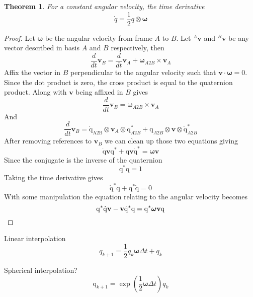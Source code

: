 \documentclass{amsart}
\newtheorem{theorem}{Theorem}[section]
\theoremstyle{definition}
\theoremstyle{remark}
\numberwithin{equation}{section}
\begin{document}
\begin{theorem}
  For a constant angular velocity, the time derivative 
  \begin{equation}
    \dot{q} = \frac{1}{2} q \otimes \boldsymbol\omega
  \end{equation}
\end{theorem}
\begin{proof}
  Let $\boldsymbol\omega$ be the angular velocity from frame $A$ to $B$. Let $^A\mathbf{v}$ and $^B\mathbf{v}$ be any vector described in basis $A$ and $B$ respectively, then
  \begin{equation}
    \frac{d}{dt} {\mathbf{v}_B} = \frac{d}{dt} {\mathbf{v}_A} + \boldsymbol\omega_{A2B} \times {\mathbf{v}_A}
  \end{equation}
  Affix the vector in $B$ perpendicular to the angular velocity such that $\mathbf{v}\cdot \boldsymbol\omega=0$. Since the dot product is zero, the cross product is equal to the quaternion product. Along with $\mathbf{v}$ being affixed in $B$ gives  
  \begin{equation}
    \frac{d}{dt} {\mathbf{v}_B} = \boldsymbol\omega_{A2B} \times {\mathbf{v}_A}
  \end{equation}
  And
  \begin{equation}
    \frac{d}{dt} {\mathbf{v}_B}
    = \mathrm{\dot{q}_{A2B}}\otimes\mathbf{v}_A\otimes\mathrm{q}_{A2B}^* + \mathrm{q}_{A2B}\otimes\mathbf{v}\otimes \mathrm{\dot{q}}_{A2B}^*
  \end{equation}
  After removing references to $\mathbf{v}_B$ we can clean up those two equations giving
  \begin{equation}
    \mathrm{\dot{q}}\mathbf{v}\mathrm{q}^* +\mathrm{q}\mathbf{v}\mathrm{\dot{q}}^* = \boldsymbol\omega\mathbf{v}
  \end{equation}
  Since the conjugate is the inverse of the quaternion
  \begin{equation}
    \mathrm{q}^*\mathrm{q} =1
  \end{equation}
  Taking the time derivative gives
  \begin{equation}
    \mathrm{\dot{q}}^*\mathrm{q} + \mathrm{q}^*\mathrm{\dot{q}} = 0
  \end{equation}
  With some manipulation the equation relating to the angular velocity becomes
  \begin{equation}
    \mathrm{q}^*\mathrm{\dot{q}}\mathbf{v}-\mathbf{v} \mathrm{\dot{q}}^*\mathrm{q} = \mathrm{q}^*\boldsymbol\omega \mathbf{v}\mathrm{q} \\
  \end{equation}
  
  
\end{proof}

Linear interpolation
\begin{equation}
  q_{k+1} = \frac{1}{2}q_k\boldsymbol\omega\Delta t + q_k 
\end{equation}

Spherical interpolation?
\begin{equation}
  \mathrm{q}_{k+1} = \exp\left(\frac{1}{2} \boldsymbol\omega\Delta t\right)q_k
\end{equation}
\end{document}
